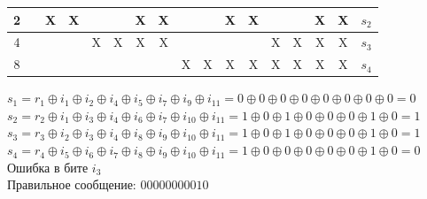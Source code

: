 \documentclass[12pt,onecolumn]{article}
\begin{document}
\begin{flushleft}
\begin{table}[!h]
\begin{tabular}{|c|c|c|c|c|c|c|c|c|c|c|c|c|c|c|c|c|}
  2     &                           & \cellcolor[HTML]{34CDF9}X & \cellcolor[HTML]{34CDF9}X &                           &                           & \cellcolor[HTML]{34CDF9}X & \cellcolor[HTML]{34CDF9}X &                           &                           & \cellcolor[HTML]{34CDF9}X & \cellcolor[HTML]{34CDF9}X &                           &                           & \cellcolor[HTML]{34CDF9}X & \cellcolor[HTML]{34CDF9}X & $s_2$ \\ \hline
  4     &                           &                           &                           & \cellcolor[HTML]{FFCC67}X & \cellcolor[HTML]{FFCC67}X & \cellcolor[HTML]{FFCC67}X & \cellcolor[HTML]{FFCC67}X &                           &                           &                           &                           & \cellcolor[HTML]{FFCC67}X & \cellcolor[HTML]{FFCC67}X & \cellcolor[HTML]{FFCC67}X & \cellcolor[HTML]{FFCC67}X & $s_3$ \\ \hline
  8     &                           &                           &                           &                           &                           &                           &                           & \cellcolor[HTML]{FD6864}X & \cellcolor[HTML]{FD6864}X & \cellcolor[HTML]{FD6864}X & \cellcolor[HTML]{FD6864}X & \cellcolor[HTML]{FD6864}X & \cellcolor[HTML]{FD6864}X & \cellcolor[HTML]{FD6864}X & \cellcolor[HTML]{FD6864}X & $s_4$ \\ \hline
  \end{tabular}
\end{table}
$s_1 = r_1\oplus i_1 \oplus i_2 \oplus i_4 \oplus i_5 \oplus i_7 \oplus i_9 \oplus i_{11} = 0 \oplus 0 \oplus 0 \oplus 0 \oplus 0 \oplus 0 \oplus 0 \oplus 0= 0 $\\
$s_2 = r_2\oplus i_1 \oplus i_3 \oplus i_4 \oplus i_6 \oplus i_7 \oplus i_{10} \oplus i_{11} = 1 \oplus 0 \oplus 1 \oplus 0 \oplus 0 \oplus 0 \oplus 1 \oplus 0 = 1 $\\
$s_3 = r_3\oplus i_2 \oplus i_3 \oplus i_4 \oplus i_8\oplus i_9 \oplus i_{10} \oplus i_{11}= 1 \oplus 0 \oplus 1 \oplus 0 \oplus 0 \oplus 0 \oplus 1 \oplus 0  = 1 $\\
$s_4 = r_4\oplus i_5 \oplus i_6 \oplus i_7 \oplus i_8\oplus i_9 \oplus i_{10} \oplus i_{11}= 1 \oplus 0 \oplus 0 \oplus 0 \oplus 0 \oplus 0 \oplus 1 \oplus 0  = 0 $\\
Ошибка в бите $i_3$\\
Правильное сообщение: $00000000010$

\end{flushleft}
\end{document}
